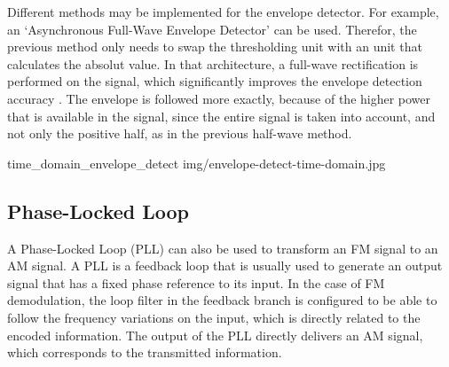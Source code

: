 Different methods may be implemented for the envelope detector.
For example, an `Asynchronous Full-Wave Envelope Detector' can be used.
Therefor, the previous method only needs to swap the thresholding unit with an unit that calculates the absolut value.
In that architecture, a full-wave rectification is performed on the signal, which significantly improves the envelope detection accuracy \cite{ref_envelope_detector}.
The envelope is followed more exactly, because of the higher power that is available in the signal, since the entire signal is taken into account, and not only the positive half, as in the previous half-wave method.

 {time_domain_envelope_detect} {img/envelope-detect-time-domain.jpg}

\subsection{Phase-Locked Loop}

A Phase-Locked Loop (PLL) can also be used to transform an FM signal to an AM signal.
A PLL is a feedback loop that is usually used to generate an output signal that has a fixed phase reference to its input.
In the case of FM demodulation, the loop filter in the feedback branch is configured to be able to follow the frequency variations on the input, which is directly related to the encoded information.
The output of the PLL directly delivers an AM signal, which corresponds to the transmitted information. \cite{ref_schnyder_haller}

